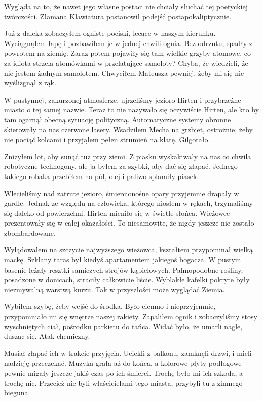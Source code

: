 \divider{}

Wygląda na to, że nawet jego własne postaci nie chciały słuchać tej poetyckiej twórczości.
Złamana Klawiatura postanowił podejść postapokaliptycznie.

\divider{}

Już z daleka zobaczyłem ogniste pociski, lecące w naszym kierunku.
Wyciągnąłem łapę i pozbawiłem je w jednej chwili ognia.
Bez odrzutu, spadły z powrotem na ziemię.
Zaraz potem pojawiły się tam wielkie grzyby atomowe, co za idiota strzela atomówkami w przelatujące samoloty?
Chyba, że wiedzieli, że nie jestem żadnym samolotem.
Chwyciłem Mateusza pewniej, żeby mi się nie wyślizgnął z rąk.

W pustynnej, zakurzonej atmosferze, ujrzeliśmy jezioro Hirten i przybrzeżne miasto o tej samej nazwie.
Teraz to nie nazywało się oczywiście Hirten, ale kto by tam ogarnął obecną sytuację polityczną.
Automatyczne systemy obronne skierowały na nas czerwone lasery. 
Wsadziłem Mecha na grzbiet, ostrożnie, żeby nie pociąć kolcami i przyjąłem pełen strumień na klatę. Gilgotało.

Zniżyłem lot, aby sunąć tuż przy ziemi.
Z piasku wyskakiwały na nas co chwila robotyczne technogony, ale ja byłem za szybki, aby dać się złapać.
Jednego takiego robaka przebiłem na pół, olej i paliwo splamiły piasek.

Wlecieliśmy nad zatrute jezioro, śmiercionośne opary przyjemnie drapały w gardle.
Jednak ze względu na człowieka, którego niosłem w rękach, trzymaliśmy się daleko od powierzchni.
Hirten mieniło się w świetle słońca. Wieżowce prezentowały się w całej okazałości.
To niesamowite, że nigdy jeszcze nie zostało zbombardowane. 

Wylądowałem na szczycie najwyższego wieżowca, kształtem przypominał wielką mackę.
Szklany taras był kiedyś apartamentem jakiegoś bogacza. W pustym basenie leżały resztki samiczych strojów kąpielowych.
Palmopodobne rośliny, posadzone w donicach, straciły całkowicie liście.
Wyblakłe kafelki pokryte były niezmywalną warstwą kurzu.
Tak w przyszłości może wyglądać Ziemia.

Wybiłem szybę, żeby wejść do środka.
Było ciemno i nieprzyjemnie, przypomniało mi się wnętrze naszej rakiety.
Zapaliłem ognik i zobaczyliśmy stosy wyschniętych ciał, pośrodku parkietu do tańca.
Widać było, że umarli nagle, dusząc się. Atak chemiczny.

Musiał złapać ich w trakcie przyjęcia.
Uciekli z balkonu, zamknęli drzwi, i mieli nadzieję przeczekać.
Muzyka grała aż do końca, a kolorowe płyty podłogowe pewnie migały jeszcze jakiś czas po ich śmierci.
Trochę było mi ich szkoda, a trochę nie.
Przecież nie byli właścicielami tego miasta, przybyli tu z zimnego bieguna.


